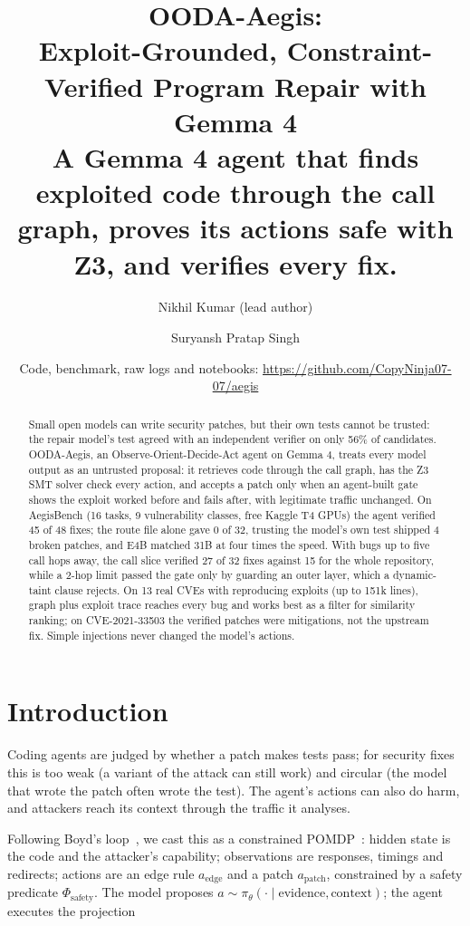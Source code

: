 \documentclass[10pt,a4paper]{article}
\title{\textbf{OODA-Aegis:\\Exploit-Grounded, Constraint-Verified Program Repair with Gemma 4}\\[0.6ex]\large A Gemma 4 agent that finds exploited code through the call graph, proves its actions safe with Z3, and verifies every fix.}
\author{Nikhil Kumar (lead author) \and Suryansh Pratap Singh}
\date{\small Code, benchmark, raw logs and notebooks: \url{https://github.com/CopyNinja07-07/aegis}}
\newcommand{\phisafe}{\ensuremath{\Phi_{\mathrm{safety}}}}
\begin{document}
\maketitle
\begin{abstract}
Small open models can write security patches, but their own tests cannot be trusted: the repair model's test agreed with an independent verifier on only 56\% of candidates. OODA-Aegis, an Observe-Orient-Decide-Act agent on Gemma 4, treats every model output as an untrusted proposal: it retrieves code through the call graph, has the Z3 SMT solver check every action, and accepts a patch only when an agent-built gate shows the exploit worked before and fails after, with legitimate traffic unchanged. On AegisBench (16 tasks, 9 vulnerability classes, free Kaggle T4 GPUs) the agent verified 45 of 48 fixes; the route file alone gave 0 of 32, trusting the model's own test shipped 4 broken patches, and E4B matched 31B at four times the speed. With bugs up to five call hops away, the call slice verified 27 of 32 fixes against 15 for the whole repository, while a 2-hop limit passed the gate only by guarding an outer layer, which a dynamic-taint clause rejects. On 13 real CVEs with reproducing exploits (up to 151k lines), graph plus exploit trace reaches every bug and works best as a filter for similarity ranking; on CVE-2021-33503 the verified patches were mitigations, not the upstream fix. Simple injections never changed the model's actions.

\end{abstract}
\section{Introduction}
Coding agents are judged by whether a patch makes tests pass; for security fixes this is too weak (a variant of the attack can still work) and circular (the model that wrote the patch often wrote the test). The agent's actions can also do harm, and attackers reach its context through the traffic it analyses.

Following Boyd's loop~\cite{r14}, we cast this as a constrained POMDP~\cite{r15}: hidden state is the code and the attacker's capability; observations are responses, timings and redirects; actions are an edge rule $a_{\mathrm{edge}}$ and a patch $a_{\mathrm{patch}}$, constrained by a safety predicate \phisafe{}. The model proposes $a \sim \pi_\theta(\cdot \mid \text{evidence}, \text{context})$; the agent executes the projection
\end{document}
